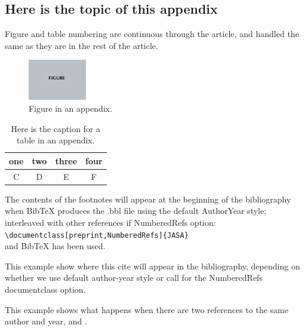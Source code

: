 \documentclass[reprint]{JASA}
\begin{document}
\appendix*

\section{}
\subsection{Here is the topic of this appendix}



Figure and table numbering are continuous through the article,
and handled the same as they are in the rest of the article.

\begin{figure}[ht]
\includegraphics[width=1in]{figsamp}
\caption{Figure in an appendix.}
\end{figure}


\begin{table}[ht]
\caption{Here is the caption for a table in an appendix.}
\centering
\begin{ruledtabular}
\begin{tabular}{cccc}
one&two&three&four\\
\hline
C&D&E&F\\
\end{tabular}
\end{ruledtabular}
\vskip12pt
\end{table}


The contents of the footnotes will appear at the beginning of the
bibliography when BibTeX produces the .bbl file using the default
AuthorYear style; interleaved with other references if 
Numbered\-Refs option:\\
\verb+\documentclass[preprint,NumberedRefs]{JASA}+\\
and BibTeX has been used.

This example show where this cite \citep{booksamp1} will appear in the
bibliography,
depending on whether we use default author-year style
or call for the NumberedRefs documentclass option.

This example shows what happens when there are two references to the
same author and year,  \citet{Shera2} and \citet{Shera}.
\end{document}
